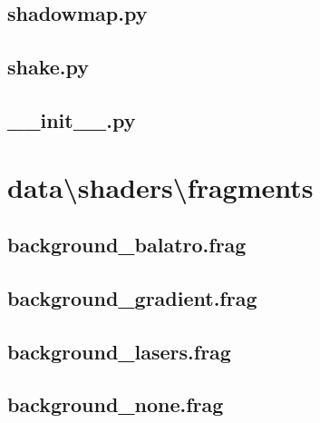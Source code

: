 \documentclass[../main/main.tex]{subfiles}
\begin{document}
\subsection{shadowmap.py}

\label{src:data/shaders/classes/shadowmap.py}

\subsection{shake.py}

\label{src:data/shaders/classes/shake.py}

\subsection{\_\_init\_\_.py}

\label{src:data/shaders/classes/__init__.py}

\section{data\textbackslash shaders\textbackslash fragments}
\subsection{background\_balatro.frag}

\label{src:data/shaders/fragments/background_balatro.frag}

\subsection{background\_gradient.frag}

\label{src:data/shaders/fragments/background_gradient.frag}

\subsection{background\_lasers.frag}

\label{src:data/shaders/fragments/background_lasers.frag}

\subsection{background\_none.frag}

\label{src:data/shaders/fragments/background_none.frag}
\end{document}
